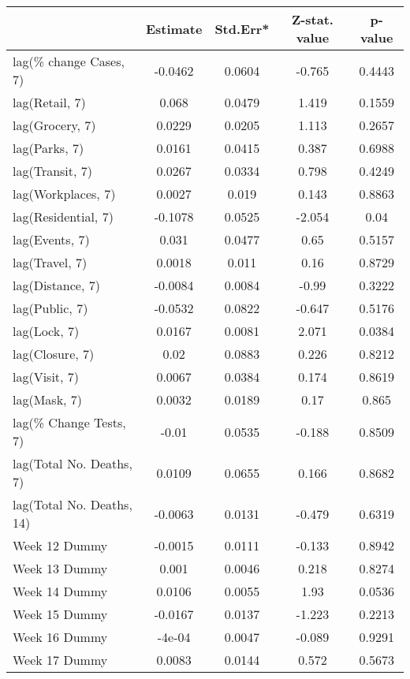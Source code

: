 \begingroup\tiny
\begin{longtable}{lcccc}
  \toprule
 & Estimate & Std.Err* & Z-stat. value & p-value \\ 
  \midrule
lag(\% change Cases, 7) & -0.0462 & 0.0604 & -0.765 & 0.4443 \\ 
  lag(Retail, 7) & 0.068 & 0.0479 & 1.419 & 0.1559 \\ 
  lag(Grocery, 7) & 0.0229 & 0.0205 & 1.113 & 0.2657 \\ 
  lag(Parks, 7) & 0.0161 & 0.0415 & 0.387 & 0.6988 \\ 
  lag(Transit, 7) & 0.0267 & 0.0334 & 0.798 & 0.4249 \\ 
  lag(Workplaces, 7) & 0.0027 & 0.019 & 0.143 & 0.8863 \\ 
  lag(Residential, 7) & -0.1078 & 0.0525 & -2.054 & 0.04 \\ 
  lag(Events, 7) & 0.031 & 0.0477 & 0.65 & 0.5157 \\ 
  lag(Travel, 7) & 0.0018 & 0.011 & 0.16 & 0.8729 \\ 
  lag(Distance, 7) & -0.0084 & 0.0084 & -0.99 & 0.3222 \\ 
  lag(Public, 7) & -0.0532 & 0.0822 & -0.647 & 0.5176 \\ 
  lag(Lock, 7) & 0.0167 & 0.0081 & 2.071 & 0.0384 \\ 
  lag(Closure, 7) & 0.02 & 0.0883 & 0.226 & 0.8212 \\ 
  lag(Visit, 7) & 0.0067 & 0.0384 & 0.174 & 0.8619 \\ 
  lag(Mask, 7) & 0.0032 & 0.0189 & 0.17 & 0.865 \\ 
  lag(\% Change Tests, 7) & -0.01 & 0.0535 & -0.188 & 0.8509 \\ 
  lag(Total No. Deaths, 7) & 0.0109 & 0.0655 & 0.166 & 0.8682 \\ 
  lag(Total No. Deaths, 14) & -0.0063 & 0.0131 & -0.479 & 0.6319 \\ 
  Week 12 Dummy & -0.0015 & 0.0111 & -0.133 & 0.8942 \\ 
  Week 13 Dummy & 0.001 & 0.0046 & 0.218 & 0.8274 \\ 
  Week 14 Dummy & 0.0106 & 0.0055 & 1.93 & 0.0536 \\ 
  Week 15 Dummy & -0.0167 & 0.0137 & -1.223 & 0.2213 \\ 
  Week 16 Dummy & -4e-04 & 0.0047 & -0.089 & 0.9291 \\ 
  Week 17 Dummy & 0.0083 & 0.0144 & 0.572 & 0.5673 \\ 

\end{longtable}
